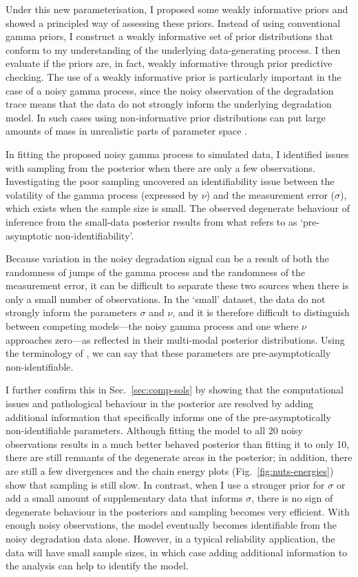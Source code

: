 Under this new parameterisation, I proposed some weakly informative priors and showed a principled way of assessing these priors. Instead of using conventional gamma priors, I construct a weakly informative set of prior distributions that conform to my understanding of the underlying data-generating process. I then evaluate if the priors are, in fact, weakly informative through prior predictive checking. The use of a weakly informative prior is particularly important in the case of a noisy gamma process, since the noisy observation of the degradation trace means that the data do not strongly inform the underlying degradation model. In such cases using non-informative prior distributions can put large amounts of mass in unrealistic parts of parameter space \citep{tian2024}.

In fitting the proposed noisy gamma process to simulated data, I identified issues with sampling from the posterior when there are only a few observations. Investigating the poor sampling uncovered an identifiability issue between the volatility of the gamma process (expressed by $\nu$) and the measurement error ($\sigma$), which exists when the sample size is small. The observed degenerate behaviour of inference from the small-data posterior results from what \citet{betancourt_2020} refers to as `pre-asymptotic non-identifiability'.

Because variation in the noisy degradation signal can be a result of both the randomness of jumps of the gamma process and the randomness of the measurement error, it can be difficult to separate these two sources when there is only a small number of observations. In the `small' dataset, the data do not strongly inform the parameters $\sigma$ and $\nu$, and it is therefore difficult to distinguish between competing models---the noisy gamma process and one where $\nu$ approaches zero---as reflected in their multi-modal posterior distributions. Using the terminology of \citet{betancourt_2020}, we can say that these parameters are pre-asymptotically non-identifiable.

I further confirm this in Sec.~\ref{sec:comp-sols} by showing that the computational issues and pathological behaviour in the posterior are resolved by adding additional information that specifically informs one of the pre-asymptotically non-identifiable parameters. Although fitting the model to all 20 noisy observations results in a much better behaved posterior than fitting it to only 10, there are still remnants of the degenerate areas in the posterior; in addition, there are still a few divergences and the chain energy plots (Fig.~\ref{fig:nuts-energies}) show that sampling is still slow. In contrast, when I use a stronger prior for $\sigma$ or add a small amount of supplementary data that informs $\sigma$, there is no sign of degenerate behaviour in the posteriors and sampling becomes very efficient. With enough noisy observations, the model eventually becomes identifiable from the noisy degradation data alone. However, in a typical reliability application, the data will have small sample sizes, in which case adding additional information to the analysis can help to identify the model.

